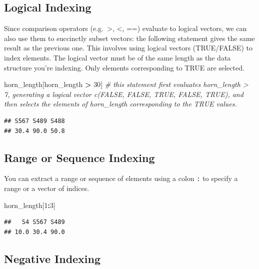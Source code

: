 \documentclass[
]{book}
\newenvironment{Shaded}{\begin{snugshade}}{\end{snugshade}}
\newcommand{\CommentTok}[1]{\textcolor[rgb]{0.56,0.35,0.01}{\textit{#1}}}
\newcommand{\DecValTok}[1]{\textcolor[rgb]{0.00,0.00,0.81}{#1}}
\newcommand{\NormalTok}[1]{#1}
\newcommand{\SpecialCharTok}[1]{\textcolor[rgb]{0.81,0.36,0.00}{\textbf{#1}}}
\begin{document}
\subsection{Logical Indexing}\label{logical-indexing}

Since comparison operators (e.g.~\textgreater, \textless, ==) evaluate to logical vectors, we can also use them to succinctly subset vectors: the following statement gives the same result as the previous one. This involves using logical vectors (TRUE/FALSE) to index elements. The logical vector must be of the same length as the data structure you're indexing. Only elements corresponding to TRUE are selected.

\begin{Shaded}
\begin{Highlighting}[]
\NormalTok{horn\_length[horn\_length }\SpecialCharTok{\textgreater{}} \DecValTok{30}\NormalTok{] }\CommentTok{\# this statement first evaluates horn\_length \textgreater{} 7, generating a logical vector c(FALSE, FALSE, TRUE, FALSE, TRUE), and then selects the elements of horn\_length corresponding to the TRUE values.}
\end{Highlighting}
\end{Shaded}

\begin{verbatim}
## S567 S489 S488 
## 30.4 90.0 50.8
\end{verbatim}

\subsection{Range or Sequence Indexing}\label{range-or-sequence-indexing}

You can extract a range or sequence of elements using a colon \texttt{:} to specify a range or a vector of indices.

\begin{Shaded}
\begin{Highlighting}[]
\NormalTok{horn\_length[}\DecValTok{1}\SpecialCharTok{:}\DecValTok{3}\NormalTok{]}
\end{Highlighting}
\end{Shaded}

\begin{verbatim}
##   S4 S567 S489 
## 10.0 30.4 90.0
\end{verbatim}

\subsection{Negative Indexing}\label{negative-indexing}
\end{document}
